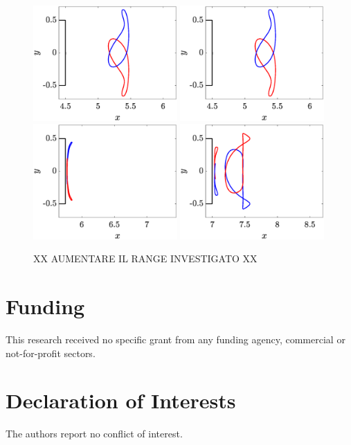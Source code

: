 \documentclass{jfm}
\begin{document}
\begin{figure}
  \centering
  \includegraphics[width=0.49\textwidth]{./fig/LagTrac/orb_AR4p5_Re410.eps}   
  \includegraphics[width=0.49\textwidth]{./fig/LagTrac/orb_AR4p5_Re410.eps} 
  \includegraphics[width=0.49\textwidth]{./fig/LagTrac/orb_AR5p75_Re550.eps}
  \includegraphics[width=0.49\textwidth]{./fig/LagTrac/orb_AR7_Re500.eps}
  \caption{XX AUMENTARE IL RANGE INVESTIGATO XX}
  \label{fig:part_res}
\end{figure}    

\section*{Funding} 
This research received no specific grant from any funding agency, commercial or not-for-profit sectors.

\section*{Declaration of Interests} 
The authors report no conflict of interest.




\end{document}
